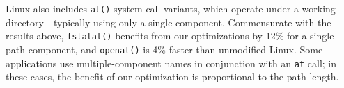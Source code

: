 Linux also includes {\tt *at()} system call variants, which operate
under a working directory---typically using only a single component.
Commensurate with the results above, {\tt fstatat()}
benefits from our optimizations by 12\% 
for a single path component, and {\tt openat()} is 4\% faster than unmodified Linux.
Some applications use multiple-component names in conjunction with an {\tt *at} call;
in these cases, the benefit of our optimization is proportional to the path length.


